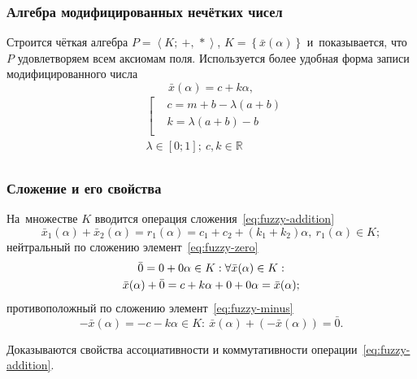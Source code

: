 \documentclass[12pt]{beamer}
\begin{document}
\begin{frame}
  \frametitle{Алгебра модифицированных нечётких чисел}
  Строится чёткая алгебра $P=\left\langle K ;\ +,\,* \right\rangle$, $K=\left\lbrace \bar x(\alpha) \right\rbrace$ и~показывается, что $P$ удовлетворяем всем аксиомам поля. Используется более удобная форма записи модифицированного числа
\begin{equation}
  \bar{x}\left( \alpha  \right)=c+k\alpha,
\end{equation}
\begin{equation}
  \label{eq:modified-number-from-abm}
  \begin{aligned}
    & \left[ \begin{aligned}
    & c=m+b-\lambda \left( a+b \right) \\ 
    & k=\lambda \left( a+b \right)-b \\ 
  \end{aligned} \right. \\ 
  & \lambda \in \left[ 0;1 \right];\ c,k\in \mathbb{R} \\ 
\end{aligned}
\end{equation}

\end{frame}

\begin{frame}
  \frametitle{Сложение и его свойства}
  На~множестве $K$ вводится операция сложения~\eqref{eq:fuzzy-addition}
  \begin{equation}
    \label{eq:fuzzy-addition}
    \bar{x}_1\left(\alpha \right)+\bar{x}_2\left(\alpha \right)=r_1\left( \alpha  \right)=c_1+c_2+\left(k_1+k_2 \right)\alpha,\ r_1 \left( \alpha  \right)\in K;
  \end{equation}
  нейтральный по сложению элемент~\eqref{eq:fuzzy-zero}
  \begin{gather}
    \label{eq:fuzzy-zero}
    \bar{0}=0+0\alpha \in K: \forall \bar{x}(\alpha )\in K: \notag \\ 
    \bar{x}(\alpha )+\bar{0}=c+k\alpha +0+0\alpha =\bar{x}(\alpha );
  \end{gather}
  противоположный по сложению элемент~\eqref{eq:fuzzy-minus} 
  \begin{equation}
    \label{eq:fuzzy-minus}
    -\bar{x}\left(\alpha \right)=-c-k\alpha \in K:\ \bar{x}\left( \alpha  \right)+\left( -\bar{x}\left( \alpha  \right) \right)=\bar{0}. 
  \end{equation}

  Доказываются свойства ассоциативности и коммутативности операции~\eqref{eq:fuzzy-addition}.
\end{frame}
\end{document}
